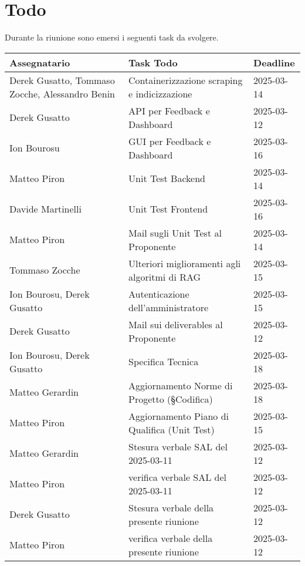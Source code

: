 \section{Todo}
Durante la riunione sono emersi i seguenti task da svolgere.

\begin{center}
  \begin{tabular}{|L{4cm}|L{6cm}|L{3cm}|}
    \hline
    \textbf{Assegnatario} & \textbf{Task Todo} & \textbf{Deadline} \\ \hline
    Derek Gusatto, Tommaso Zocche, Alessandro Benin &  Containerizzazione scraping e indicizzazione &  2025-03-14 \\ \hline
    Derek Gusatto &  API per Feedback e Dashboard &  2025-03-12 \\ \hline
    Ion Bourosu &  GUI  per Feedback e Dashboard &  2025-03-16 \\ \hline
    Matteo Piron &  Unit Test Backend &  2025-03-14 \\ \hline
    Davide Martinelli &  Unit Test Frontend &  2025-03-16 \\ \hline
    Matteo Piron &  Mail sugli Unit Test al Proponente &  2025-03-14 \\ \hline
    Tommaso Zocche &  Ulteriori miglioramenti agli algoritmi di RAG &  2025-03-15 \\ \hline
    Ion Bourosu, Derek Gusatto &  Autenticazione dell'amministratore &  2025-03-15 \\ \hline
    Derek Gusatto &  Mail sui deliverables al Proponente &  2025-03-12 \\ \hline
    Ion Bourosu, Derek Gusatto &  Specifica Tecnica &  2025-03-18 \\ \hline
     Matteo Gerardin &  Aggiornamento Norme di Progetto (§Codifica) &  2025-03-18 \\ \hline
     Matteo Piron &  Aggiornamento Piano di Qualifica (Unit Test) &  2025-03-15 \\ \hline
    Matteo Gerardin &  Stesura verbale SAL del 2025-03-11 &  2025-03-12 \\ \hline
   Matteo Piron &  verifica verbale SAL del 2025-03-11 &  2025-03-12 \\ \hline
    Derek Gusatto &  Stesura verbale della presente riunione &  2025-03-12 \\ \hline
   Matteo Piron &  verifica verbale della presente riunione &  2025-03-12 \\
   \hline
  \end{tabular}
\end{center}